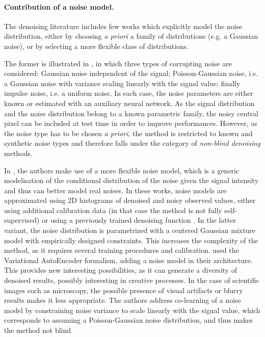 \documentclass{article}
\begin{document}
\paragraph{Contribution of a noise model.}
The denoising literature includes few works which explicitly model the noise distribution, either by choosing \textit{a priori} a  family of distributions (e.g. a Gaussian noise), or by selecting a more flexible class of distributions.

The former is illustrated in \cite{laine2019high}, in which three types of corrupting noise are considered: Gaussian noise independent of the signal; Poisson-Gaussian noise, i.e. a Gaussian noise with variance scaling linearly with the signal value; finally impulse noise, i.e. a uniform noise. In each case, the noise parameters are either known or estimated with an auxiliary neural network. As the signal distribution and the noise distribution belong to a known parametric family, the noisy central pixel can be included at test time in order to improve performances. However, as the noise type has to be chosen \textit{a priori}, the method is restricted to known and synthetic noise types and therefore falls under the category of \textit{non-blind denoising} methods.

In \cite{krull2019probabilistic,prakash2020fully}, the authors make use of a more flexible noise model, which is a generic modelisation of the conditional distribution of the noise given the signal intensity and thus can better model real noises.
In these works, noise models are approximated using 2D histograms of denoised and noisy observed values, either using additional calibration data (in that case the method is not fully self-supervised) or using a previously trained denoising function \cite{prakash2020fully}.
In the latter variant, the noise distribution is parametrized with a centered Gaussian mixture model with empirically designed constraints.
This increases the complexity of the method, as it requires several training procedures and calibration.
\cite{2020DivNoising} used the Variational Auto\-Encoder formalism, adding a noise model in their architecture.
This provides new interesting possibilities, as it can generate a diversity of denoised results, possibly interesting in creative processes.
In the case of scientific images such as microscopy, the possible presence of visual artifacts or blurry results makes it less appropriate.
The authors address co-learning of a noise model by constraining noise variance to scale linearly with the signal value, which corresponds to assuming a Poisson-Gaussian noise distribution, and thus makes the method not blind.
\end{document}
